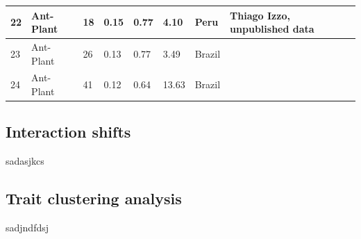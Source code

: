 \documentclass[a4paper, 12pt]{article}
\begin{document}
\begin{table}[H]
\begin{adjustbox}{width=\columnwidth,center}
{\begin{tabular}{|l|l|l|l|l|l|l|l|}
22                                 & Ant-Plant                          & 18                              & 0.15                            & 0.77                            & 4.10                               & Peru                                   & Thiago Izzo, unpublished data                   \\ \hline
23                                 & Ant-Plant                          & 26                              & 0.13                            & 0.77                            & 3.49                               & Brazil                                 & \textcite{davidson_symbiosis_1991}                         \\ \hline
24                                 & Ant-Plant                          & 41                              & 0.12                            & 0.64                            & 13.63                              & Brazil                                 & \textcite{fonseca_asymmetries_1996}                          \\ \hline
\end{tabular}}
\end{adjustbox}
\end{table}


\subsection*{Interaction shifts}
sadasjkcs

\subsection*{Trait clustering analysis}
sadjndfdsj

\renewcommand{\thefigure}{S\arabic{figure}}
\setcounter{figure}{0}  

\end{document}
